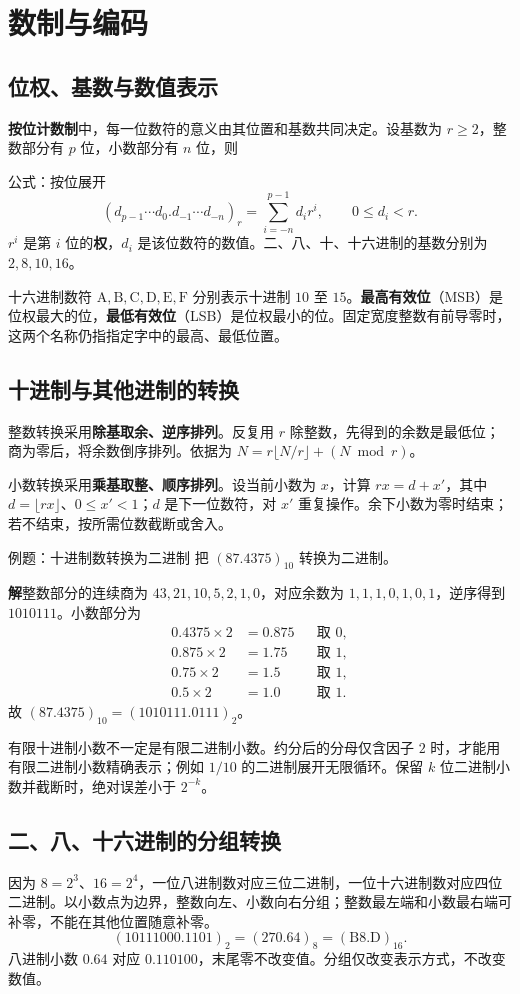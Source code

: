 \documentclass[UTF8,fontset=none,zihao=-4,a4paper]{ctexart}
\newcommand{\chapterpage}[1]{\clearpage\section{#1}}
\newcommand{\term}[1]{\textbf{#1}}
\newcommand{\sol}{\par\noindent\textbf{解}\quad}
\begin{document}
\chapterpage{数制与编码}
\subsection{位权、基数与数值表示}
\term{按位计数制}中，每一位数符的意义由其位置和基数共同决定。设基数为 $r\ge2$，整数部分有 $p$ 位，小数部分有 $n$ 位，则
\begin{infobox}{公式：按位展开}
\[
(d_{p-1}\cdots d_0.d_{-1}\cdots d_{-n})_r
=\sum_{i=-n}^{p-1}d_i r^i,\qquad 0\le d_i<r.
\]
$r^i$ 是第 $i$ 位的\term{权}，$d_i$ 是该位数符的数值。二、八、十、十六进制的基数分别为 $2,8,10,16$。
\end{infobox}
十六进制数符 $\mathrm{A,B,C,D,E,F}$ 分别表示十进制 $10$ 至 $15$。\term{最高有效位}（MSB）是位权最大的位，\term{最低有效位}（LSB）是位权最小的位。固定宽度整数有前导零时，这两个名称仍指指定字中的最高、最低位置。

\subsection{十进制与其他进制的转换}
整数转换采用\term{除基取余、逆序排列}。反复用 $r$ 除整数，先得到的余数是最低位；商为零后，将余数倒序排列。依据为 $N=r\lfloor N/r\rfloor+(N\bmod r)$。

小数转换采用\term{乘基取整、顺序排列}。设当前小数为 $x$，计算 $rx=d+x'$，其中 $d=\lfloor rx\rfloor$、$0\le x'<1$；$d$ 是下一位数符，对 $x'$ 重复操作。余下小数为零时结束；若不结束，按所需位数截断或舍入。
\begin{infobox}{例题：十进制数转换为二进制}
把 $(87.4375)_{10}$ 转换为二进制。
\end{infobox}
\sol 整数部分的连续商为 $43,21,10,5,2,1,0$，对应余数为 $1,1,1,0,1,0,1$，逆序得到 $1010111$。小数部分为
\begin{align*}
0.4375\times2&=0.875 &&\text{取 }0,\\
0.875\times2&=1.75 &&\text{取 }1,\\
0.75\times2&=1.5 &&\text{取 }1,\\
0.5\times2&=1.0 &&\text{取 }1.
\end{align*}
故 $(87.4375)_{10}=(1010111.0111)_2$。

有限十进制小数不一定是有限二进制小数。约分后的分母仅含因子 $2$ 时，才能用有限二进制小数精确表示；例如 $1/10$ 的二进制展开无限循环。保留 $k$ 位二进制小数并截断时，绝对误差小于 $2^{-k}$。

\subsection{二、八、十六进制的分组转换}
因为 $8=2^3$、$16=2^4$，一位八进制数对应三位二进制，一位十六进制数对应四位二进制。以小数点为边界，整数向左、小数向右分组；整数最左端和小数最右端可补零，不能在其他位置随意补零。
\[
(10111000.1101)_2=(270.64)_8=(\mathrm{B8.D})_{16}.
\]
八进制小数 $0.64$ 对应 $0.110100$，末尾零不改变值。分组仅改变表示方式，不改变数值。
\end{document}
